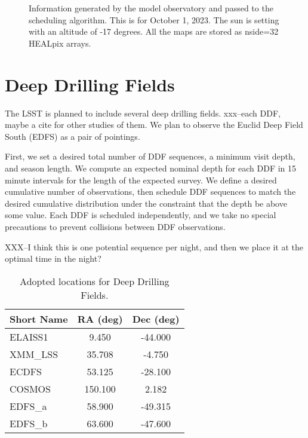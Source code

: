 \documentclass[]{aastex631}
\begin{document}
\begin{figure}
     \\
     \\
    \caption{Information generated by the model observatory and passed to the scheduling algorithm. This is for October 1, 2023. The sun is setting with an altitude of -17 degrees. All the maps are stored as nside=32 HEALpix arrays. }
    \label{fig:conditions}
\end{figure}


\section{Deep Drilling Fields}

The LSST is planned to include several deep drilling fields. xxx--each DDF, maybe a cite for other studies of them. We plan to observe the Euclid Deep Field South (EDFS) as a pair of pointings. 

First, we set a desired total number of DDF sequences, a minimum visit depth, and season length. We compute an expected nominal depth for each DDF in 15 minute intervals for the length of the expected survey. We define a desired cumulative number of observations, then schedule DDF sequences to match the desired cumulative distribution under the constraint that the depth be above some value. Each DDF is scheduled independently, and we take no special precautions to prevent collisions between DDF observations. 

XXX--I think this is one potential sequence per night, and then we place it at the optimal time in the night?



\begin{table}
    \centering
        \begin{tabular}{lcc}
        \toprule
        Short Name &      RA (deg) &     Dec (deg) \\
        \hline
           ELAISS1 &   9.450 & -44.000 \\
           XMM\_LSS &  35.708 &  -4.750 \\
             ECDFS &  53.125 & -28.100 \\
            COSMOS & 150.100 &   2.182 \\
            EDFS\_a &  58.900 & -49.315 \\
            EDFS\_b &  63.600 & -47.600 \\
        \hline
        \end{tabular}
    \caption{Adopted locations for Deep Drilling Fields.}
    \label{tab:ddf_loc}
\end{table}
\end{document}
